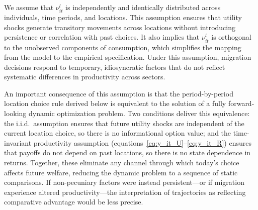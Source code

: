 \documentclass[12pt]{article}
\begin{document}
We assume that $\nu_{it}^l$ is independently and identically distributed across individuals, time periods, and locations. 
This assumption ensures that utility shocks generate transitory movements across locations without introducing persistence or correlation with past choices.
It also implies that $\nu_{it}^{l}$ is orthogonal to the unobserved components of consumption, which simplifies the mapping from the model to the empirical specification.
Under this assumption, migration decisions respond to temporary, idiosyncratic factors that do not reflect systematic differences in productivity across sectors.

An important consequence of this assumption is that the period-by-period location choice rule derived below is equivalent to the solution of a fully forward-looking dynamic optimization problem.
Two conditions deliver this equivalence: the i.i.d.\ assumption ensures that future utility shocks are independent of the current location choice, so there is no informational option value; and the time-invariant productivity assumption (equations~\ref{eq:y_it_U}--\ref{eq:y_it_R}) ensures that payoffs do not depend on past locations, so there is no state dependence in returns.
Together, these eliminate any channel through which today's choice affects future welfare, reducing the dynamic problem to a sequence of static comparisons.
If non-pecuniary factors were instead persistent---or if migration experience altered productivity---the interpretation of trajectories as reflecting comparative advantage would be less precise.
\end{document}
